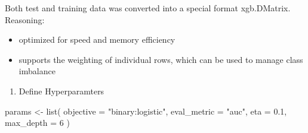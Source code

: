 \documentclass[
  11pt,
  letterpaper,
  DIV=11,
  numbers=noendperiod]{scrartcl}
\newenvironment{Shaded}{}{}
\newcommand{\AttributeTok}[1]{\textcolor[rgb]{0.84,0.23,0.29}{#1}}
\newcommand{\CommentTok}[1]{\textcolor[rgb]{0.42,0.45,0.49}{#1}}
\newcommand{\DecValTok}[1]{\textcolor[rgb]{0.00,0.36,0.77}{#1}}
\newcommand{\FloatTok}[1]{\textcolor[rgb]{0.00,0.36,0.77}{#1}}
\newcommand{\FunctionTok}[1]{\textcolor[rgb]{0.44,0.26,0.76}{#1}}
\newcommand{\NormalTok}[1]{\textcolor[rgb]{0.14,0.16,0.18}{#1}}
\newcommand{\OtherTok}[1]{\textcolor[rgb]{0.44,0.26,0.76}{#1}}
\newcommand{\SpecialCharTok}[1]{\textcolor[rgb]{0.00,0.36,0.77}{#1}}
\newcommand{\StringTok}[1]{\textcolor[rgb]{0.01,0.18,0.38}{#1}}
\providecommand{\tightlist}{%
  \setlength{\itemsep}{0pt}\setlength{\parskip}{0pt}}\usepackage{longtable,booktabs,array}
\begin{document}
\begin{Shaded}
\end{Shaded}

Both test and training data was converted into a special format
xgb.DMatrix. Reasoning:

\begin{itemize}
\item
  optimized for speed and memory efficiency
\item
  supports the weighting of individual rows, which can be used to manage
  class imbalance
\end{itemize}

\begin{enumerate}
\def\labelenumi{\arabic{enumi}.}
\setcounter{enumi}{1}
\tightlist
\item
  Define Hyperparamters
\end{enumerate}

\begin{Shaded}
\begin{Highlighting}[]
\NormalTok{params }\OtherTok{\textless{}{-}} \FunctionTok{list}\NormalTok{(}
  \AttributeTok{objective =} \StringTok{"binary:logistic"}\NormalTok{,}
  \AttributeTok{eval\_metric =} \StringTok{"auc"}\NormalTok{,}
  \AttributeTok{eta =} \FloatTok{0.1}\NormalTok{,}
  \AttributeTok{max\_depth =} \DecValTok{6}
\NormalTok{)}
\end{Highlighting}
\end{Shaded}
\end{document}
